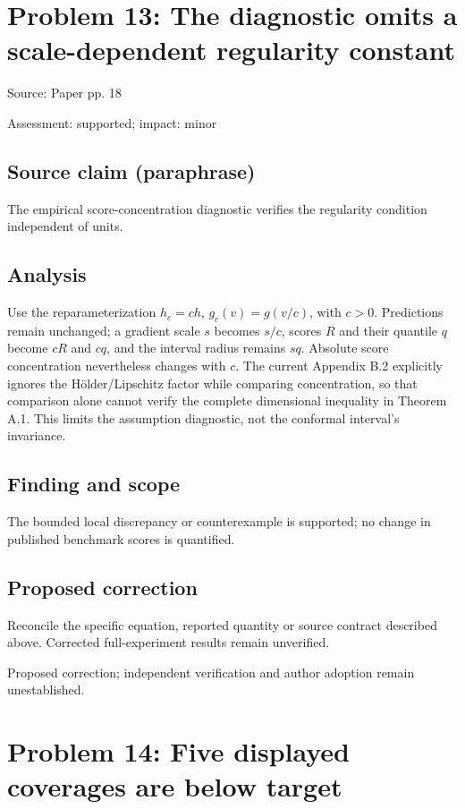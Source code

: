 \documentclass[11pt]{article}
\begin{document}
\section*{Problem 13: The diagnostic omits a scale-dependent regularity constant}

Source: Paper pp. 18

Assessment: supported; impact: minor

\subsection*{Source claim (paraphrase)}

The empirical score-concentration diagnostic verifies the regularity condition independent of units.

\subsection*{Analysis}

Use the reparameterization \(h_c=ch\), \(g_c(v)=g(v/c)\), with \(c>0\). Predictions remain unchanged; a gradient scale \(s\) becomes \(s/c\), scores \(R\) and their quantile \(q\) become \(cR\) and \(cq\), and the interval radius remains \(sq\). Absolute score concentration nevertheless changes with \(c\). The current Appendix B.2 explicitly ignores the Hölder/Lipschitz factor while comparing concentration, so that comparison alone cannot verify the complete dimensional inequality in Theorem A.1. This limits the assumption diagnostic, not the conformal interval’s invariance.

\subsection*{Finding and scope}

The bounded local discrepancy or counterexample is supported; no change in published benchmark scores is quantified.

\subsection*{Proposed correction}

Reconcile the specific equation, reported quantity or source contract described above. Corrected full-experiment results remain unverified.

Proposed correction; independent verification and author adoption remain unestablished.

\section*{Problem 14: Five displayed coverages are below target}
\end{document}
